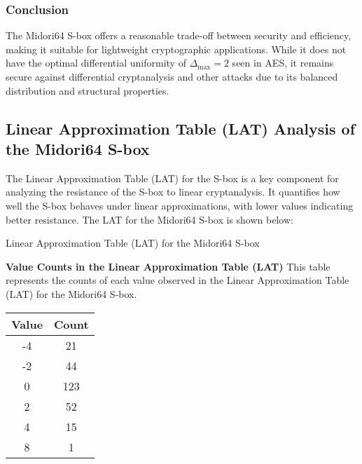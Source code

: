 \subsubsection*{Conclusion}

The Midori64 S-box offers a reasonable trade-off between security and
efficiency, making it suitable for lightweight cryptographic applications. While
it does not have the optimal differential uniformity of \( \Delta_{\text{max}} = 2 \)
seen in AES, it remains secure against differential cryptanalysis and other
attacks due to its balanced distribution and structural properties.

\subsection{Linear Approximation Table (LAT) Analysis of the Midori64 S-box}

\noindent The Linear Approximation Table (LAT) for the S-box is a key component
for analyzing the resistance of the S-box to linear cryptanalysis. It quantifies
how well the S-box behaves under linear approximations, with lower values
indicating better resistance. The LAT for the Midori64 S-box is shown below:

\begin{table}[h!]
	\centering
	\label{tab:lat}
	\caption{Linear Approximation Table (LAT) for the Midori64 S-box}
	\setlength{\tabcolsep}{8pt}
	\vspace{12pt}
	
\end{table}

\textbf{Value Counts in the Linear Approximation Table (LAT)}
This table represents the counts of each value observed in the Linear
Approximation Table (LAT) for the Midori64 S-box.

\begin{table}[h!]
	\centering
	\setlength{\tabcolsep}{5pt}
	\begin{tabular}{|c|c|}
		\hline
		\textbf{Value} & \textbf{Count} \\
		\hline
		-4             & 21             \\
		-2             & 44             \\
		0              & 123            \\
		2              & 52             \\
		4              & 15             \\
		8              & 1              \\
		\hline
	\end{tabular}
\end{table}

